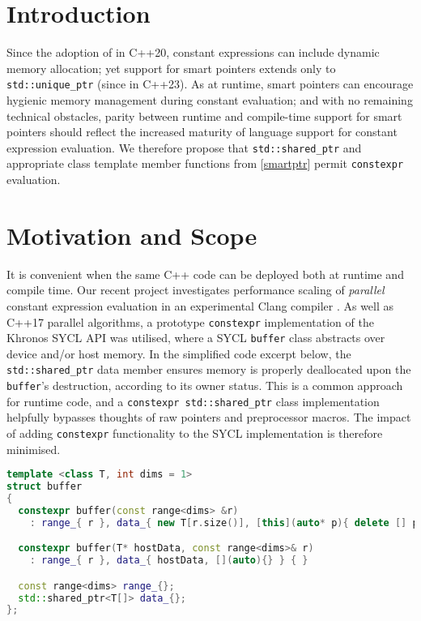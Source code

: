 \documentclass[10pt]{article}
\newcommand*{\wgxxi}[1]{[\href{https://wg21.link/#1}{#1}]}
\begin{document}
\section{Introduction}

Since the adoption of \cite{P0784R7} in C++20, constant expressions can include
dynamic memory allocation; yet support for smart pointers extends only to
\texttt{std::unique\_ptr} (since \cite{P2273R3} in C++23). As at runtime, smart
pointers can encourage hygienic memory management during constant evaluation;
and with no remaining technical obstacles, parity between runtime and
compile-time support for smart pointers should reflect the increased maturity
of language support for constant expression evaluation.  We therefore propose
that \texttt{std::shared\_ptr} and appropriate class template member functions
from \wgxxi{smartptr} permit \texttt{constexpr} evaluation.

\section{Motivation and Scope}

It is convenient when the same C++ code can be deployed both at runtime and
compile time. Our recent project investigates performance scaling of
\emph{parallel} constant expression evaluation in an experimental Clang
compiler \cite{ClangOz}. As well as C++17 parallel algorithms, a prototype
\texttt{constexpr} implementation of the Khronos SYCL API was utilised, where a
SYCL \texttt{buffer} class abstracts over device and/or host memory. In the
simplified code excerpt below, the \texttt{std::shared\_ptr} data member
ensures memory is properly deallocated upon the \texttt{buffer}'s destruction,
according to its owner status. This is a common approach for runtime code, and
a \texttt{constexpr std::shared\_ptr} class implementation helpfully bypasses
thoughts of raw pointers and preprocessor macros. The impact of adding
\texttt{constexpr} functionality to the SYCL implementation is therefore
minimised.

\begin{lstlisting}[language=cpp]
template <class T, int dims = 1>
struct buffer
{
  constexpr buffer(const range<dims> &r)
    : range_{ r }, data_{ new T[r.size()], [this](auto* p){ delete [] p; } } { }

  constexpr buffer(T* hostData, const range<dims>& r)
    : range_{ r }, data_{ hostData, [](auto){} } { }

  const range<dims> range_{};
  std::shared_ptr<T[]> data_{};
};
\end{lstlisting}
\end{document}
